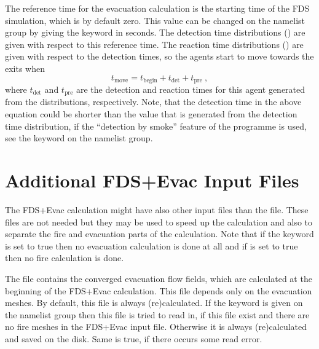 \documentclass[12pt,a4paper,final,twoside]{stylevk}
\begin{document}
\noindent The reference time for the evacuation calculation is the
starting time of the FDS simulation, which is by default zero.  This
value can be changed on the  namelist group by giving the
keyword  in seconds.  The detection time distributions
() are given with respect to this reference
time.  The reaction time distributions () are
given with respect to the detection times, so the agents start to move
towards the exits when
\begin{equation}
 t_\textrm{move} = t_\textrm{begin} + t_\textrm{det} + t_\textrm{pre} ~,
\end{equation}
where $t_\textrm{det}$ and $t_\textrm{pre}$ are the detection and
reaction times for this agent generated from the distributions,
respectively.  Note, that the detection time in the above equation
could be shorter than the value that is generated from the detection
time distribution, if the ``detection by smoke'' feature of the
programme is used, see the  keyword on the
 namelist group.


\section{Additional FDS+Evac Input Files}\label{Sec_InFiles}

\noindent The FDS+Evac calculation might have also other input files
than the  file.  These files are not needed but they
may be used to speed up the calculation and also to separate the fire
and evacuation parts of the calculation.  Note that if the keyword
 is set to true then no evacuation calculation
is done at all and if  is set to true then no
fire calculation is done.


The file  contains the converged evacuation flow
fields, which are calculated at the beginning of the FDS+Evac
calculation.  This file depends only on the evacuation meshes.  By
default, this file is always (re)calculated.  If the keyword
 is given on the 
namelist group then this file is tried to read in, if this file exist
and there are no fire meshes in the FDS+Evac input file.  Otherwise it
is always (re)calculated and saved on the disk.  Same is true, if
there occurs some read error.
\end{document}
